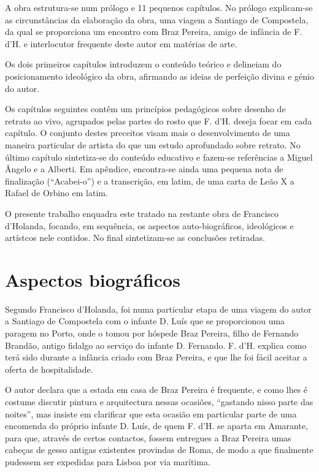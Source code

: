 \documentclass{article}
\begin{document}
A obra estrutura-se num prólogo e 11 pequenos capítulos. No prólogo
explicam-se as circunstâncias da elaboração da obra, uma viagem a
Santiago de Compostela, da qual se proporciona um encontro com Braz
Pereira, amigo de infância de F. d'H. e interlocutor frequente deste
autor em matérias de arte.

Os dois primeiros capítulos introduzem o conteúdo teórico e delineiam
do posicionamento ideológico da obra, afirmando as ideias de perfeição
divina e génio do autor.

Os capítulos seguintes contêm um princípios pedagógicos sobre desenho
de retrato ao vivo, agrupados pelas partes do rosto que F. d'H. deseja
focar em cada capítulo. O conjunto destes preceitos visam mais o
desenvolvimento de uma maneira particular de artista do que um estudo
aprofundado sobre retrato. No último capítulo sintetiza-se do conteúdo
educativo e fazem-se referências a Miguel Ângelo e a Alberti. Em
apêndice, encontra-se ainda uma pequena nota de finalização
(``Acabei-o'') e a transcrição, em latim, de uma carta de Leão X a Rafael de
Orbino em latim.

O presente trabalho enquadra este tratado na restante obra de
Francisco d'Holanda, focando, em sequência, os aspectos
auto-biográficos, ideológicos e artístcos nele contidos. No final
sintetizam-se as conclusões retiradas.

\section{Aspectos biográficos}

Segundo Francisco d'Holanda, foi numa particular etapa de uma viagem
do autor a Santiago de Compostela com o infante D. Luís que se
proporcionou uma paragem no Porto, onde o tomou por hóspede Braz
Pereira, filho de Fernando Brandão, antigo fidalgo ao serviço do
infante D. Fernando. F. d'H. explica como terá sido durante a infância
criado com Braz Pereira, e que lhe foi fácil aceitar a oferta de
hospitalidade.

O autor declara que a estada em casa de Braz Pereira é frequente, e
como lhes é costume discutir pintura e arquitectura nessas ocasiões,
``gastando nisso parte das noites'', mas insiste em clarificar que
esta ocasião em particular parte de uma encomenda do próprio infante
D. Luís, de quem F. d'H. se aparta em Amarante, para que, através de
certos contactos, fossem entregues a Braz Pereira umas cabeças de
gesso antigas existentes provindas de Roma, de modo a que finalmente
pudessem ser expedidas para Lisboa por via marítima.
\end{document}
